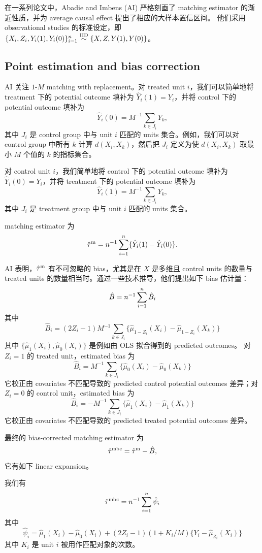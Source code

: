 在一系列论文中，Abadie and Imbens (AI) 严格刻画了 matching estimator 的渐近性质，并为 average causal effect 提出了相应的大样本置信区间。
他们采用 observational studies 的标准设定，即 $\{ X_i , Z_i ,Y_i(1), Y_i(0)  \}_{i=1}^n \stackrel{\textup{IID}}{\sim} \{ X, Z, Y(1), Y(0) \}$。

\subsection{Point estimation and bias correction}

AI 关注 $1$-$M$ matching with replacement。对 treated unit $i$，我们可以简单地将 treatment 下的 potential outcome 填补为 $\hat{Y}_i(1) = Y_i$，并将 control 下的 potential outcome 填补为
$$
\hat{Y}_i(0) = M^{-1} \sum_{k\in J_i} Y_k,
$$
其中 $J_i$ 是 control group 中与 unit $i$ 匹配的 units 集合。例如，我们可以对 control group 中所有 $k$ 计算 $d(X_i, X_k)$，然后把 $J_i$ 定义为使 $d(X_i, X_k)$ 取最小 $M$ 个值的 $k$ 的指标集合。




对 control unit $i$，我们简单地将 control 下的 potential outcome 填补为 $\hat{Y}_i(0) = Y_i$，并将 treatment 下的 potential outcome 填补为
$$
\hat{Y}_i(1) = M^{-1} \sum_{k\in J_i} Y_k,
$$
其中 $J_i$ 是 treatment group 中与 unit $i$ 匹配的 units 集合。

matching estimator 为
$$
\hat{\tau}^\textup{m} = n^{-1} \sum_{i=1}^n \{\hat{Y}_i(1) -\hat{Y}_i(0) \}.
$$

AI 表明，$\hat{\tau}^\textup{m}$ 有不可忽略的 bias，尤其是在 $X$ 是多维且 control units 的数量与 treated units 的数量相当时。通过一些技术推导，他们提出如下 bias 估计量：
$$
\hat{B} = n^{-1} \sum_{i=1}^n  \hat{B}_i
$$
其中
$$
\hat{B}_i = (2Z_i - 1) M^{-1} \sum_{k\in J_i} \{  \hat{\mu}_{1-Z_i}(X_i) -  \hat{\mu}_{1-Z_i}(X_k)     \}
$$
其中 $\{  \hat{\mu}_1(X_i), \hat{\mu}_0(X_i) \}$ 是例如由 OLS 拟合得到的 predicted outcomes。
对 $Z_i  =1$ 的 treated unit，estimated bias 为
$$
\hat{B}_i = M^{-1} \sum_{k\in J_i} \{  \hat{\mu}_{0}(X_i) -  \hat{\mu}_{0}(X_k)     \}
$$
它校正由 covariates 不匹配导致的 predicted control potential outcomes 差异；对 $Z_i = 0$ 的 control unit，estimated bias 为
 $$
\hat{B}_i =  - M^{-1} \sum_{k\in J_i} \{  \hat{\mu}_{1}(X_i) -  \hat{\mu}_{1}(X_k)     \}
$$
它校正由 covariates 不匹配导致的 predicted treated potential outcomes 差异。


最终的 bias-corrected matching estimator 为
$$
\hat{\tau}^\textup{mbc} = \hat{\tau}^\textup{m}  - \hat{B},
$$
 它有如下 linear expansion。
 
 \begin{proposition}
 \label{prop::matching-expansion-ate} 我们有
 \begin{eqnarray}\label{eq::linearATE}
\hat{\tau}^\textup{mbc}  
= n^{-1} \sum_{i=1}^n \hat{\psi}_i
\end{eqnarray} 
其中
 $$
  \hat{\psi}_i = \hat{\mu}_1(X_i) -  \hat{\mu}_0(X_i) + (2Z_i - 1) (1+K_i/M) \{   Y_i - \hat{\mu}_{Z_i}(X_i)  \}
 $$
 其中 $K_i$ 是 unit $i$ 被用作匹配对象的次数。
 \end{proposition}
 
